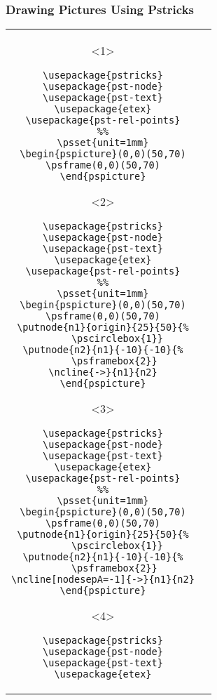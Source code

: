 \documentclass[handout]{beamer}
\begin{document}
\begin{frame}[fragile]
\frametitle{Drawing Pictures Using Pstricks}

\begin{tabular}{@{}cc@{}}
\begin{onlyenv}<1>
\begin{minipage}{62mm}
\begin{verbatim}
\usepackage{pstricks}
\usepackage{pst-node}
\usepackage{pst-text}
\usepackage{etex}
\usepackage{pst-rel-points}
%%
\psset{unit=1mm}
\begin{pspicture}(0,0)(50,70)
\psframe(0,0)(50,70)
\end{pspicture}
\end{verbatim}
\end{minipage}
\end{onlyenv}%
\begin{onlyenv}<2>
\begin{minipage}{62mm}
\begin{verbatim}
\usepackage{pstricks}
\usepackage{pst-node}
\usepackage{pst-text}
\usepackage{etex}
\usepackage{pst-rel-points}
%%
\psset{unit=1mm}
\begin{pspicture}(0,0)(50,70)
\psframe(0,0)(50,70)
\putnode{n1}{origin}{25}{50}{%
     \pscirclebox{1}}
\putnode{n2}{n1}{-10}{-10}{%
     \psframebox{2}} 
\ncline{->}{n1}{n2}
\end{pspicture}
\end{verbatim}
\end{minipage}
\end{onlyenv}%
\begin{onlyenv}<3>
\begin{minipage}{62mm}
\begin{verbatim}
\usepackage{pstricks}
\usepackage{pst-node}
\usepackage{pst-text}
\usepackage{etex}
\usepackage{pst-rel-points}
%%
\psset{unit=1mm}
\begin{pspicture}(0,0)(50,70)
\psframe(0,0)(50,70)
\putnode{n1}{origin}{25}{50}{%
     \pscirclebox{1}}
\putnode{n2}{n1}{-10}{-10}{%
     \psframebox{2}} 
\ncline[nodesepA=-1]{->}{n1}{n2}
\end{pspicture}
\end{verbatim}
\end{minipage}
\end{onlyenv}%
\begin{onlyenv}<4>
\begin{minipage}{62mm}
\begin{verbatim}
\usepackage{pstricks}
\usepackage{pst-node}
\usepackage{pst-text}
\usepackage{etex}

\end{verbatim}
\end{minipage}
\end{onlyenv}
\end{tabular}
\end{frame}
\end{document}
